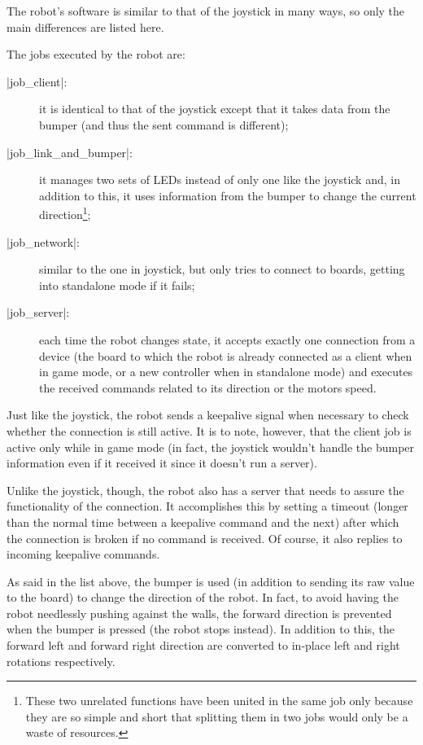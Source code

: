The robot's software is similar to that of the joystick in many ways, so only
the main differences are listed here.

\beforelist The jobs executed by the robot are:
\begin{description}
  \item[\Code|job\_client|:] it is identical to that of the joystick except that
    it takes data from the bumper (and thus the sent command is different);
  \item[\Code|job\_link\_and\_bumper|:] it manages two sets of LEDs instead of
    only one like the joystick and, in addition to this, it uses information
    from the bumper to change the current direction\footnote{These two unrelated
    functions have been united in the same job only because they are so simple
    and short that splitting them in two jobs would only be a waste of
    resources.};
  \item[\Code|job\_network|:] similar to the one in joystick, but only tries to
    connect to boards, getting into standalone mode if it fails;
  \item[\Code|job\_server|:] each time the robot changes state, it accepts
    exactly one connection from a device (the board to which the robot is
    already connected as a client when in game mode, or a new controller when in
    standalone mode) and executes the received commands related to its direction
    or the motors speed.
\end{description}
\afterlist*
Just like the joystick, the robot sends a keepalive signal when necessary to
check whether the connection is still active.
It is to note, however, that the client job is active only while in game mode
(in fact, the joystick wouldn't handle the bumper information even if it
received it since it doesn't run a server).

Unlike the joystick, though, the robot also has a server that needs to assure
the functionality of the connection.
It accomplishes this by setting a timeout (longer than the normal time between
a keepalive command and the next) after which the connection is broken if no
command is received.
Of course, it also replies to incoming keepalive commands.

As said in the list above, the bumper is used (in addition to sending its raw
value to the board) to change the direction of the robot.
In fact, to avoid having the robot needlessly pushing against the walls, the
forward direction is prevented when the bumper is pressed (the robot stops
instead).
In addition to this, the forward left and forward right direction are converted
to in-place left and right rotations respectively.

